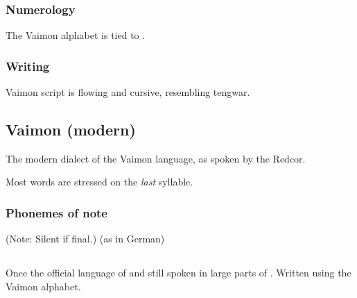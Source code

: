 \subsubsection{Numerology}
The Vaimon alphabet is tied to . 





\subsubsection{Writing}
Vaimon script is flowing and cursive, resembling tengwar. 









\subsection{Vaimon (modern)}
The modern dialect of the Vaimon language, as spoken by the Redcor. 

Most words are stressed on the \emph{last} syllable. 





\begin{pronunciationenvironment}{\subsubsection{Phonemes of note}}
   (Note: Silent if final.)
   (as in German)
\end{pronunciationenvironment}














\subsection{\Velcadian}
Once the official language of  and still spoken in large parts of \Velcad. 
Written using the Vaimon alphabet. 





